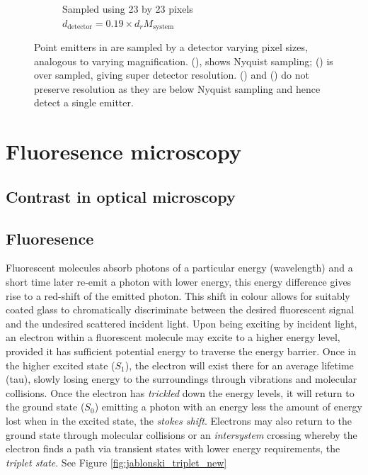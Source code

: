 \begin{figure}
\begin{subfigure}[b]{0.4\textwidth}
        \caption{Sampled using 23 by 23 pixels\\$d_{\text{detector}} = 0.19 \times d_{r}M_{\text{system}}$}
        \label{fig:digital_airy_sample_23}
    \end{subfigure}
    \caption{Point emitters in  are sampled by a detector varying pixel sizes, analogous to varying magnification.
    (), shows Nyquist sampling;
    () is over sampled, giving super detector resolution.
    () and () do not preserve resolution as they are below Nyquist sampling and hence detect a single emitter.}
    \label{fig:airy_disk_resolution}
\end{figure}


%
%


\section{Fluoresence microscopy}
\subsection{Contrast in optical microscopy}
\subsection{Fluoresence}

Fluorescent molecules absorb photons of a particular energy (wavelength) and a short time later re-emit a photon with lower energy, this energy difference gives rise to a red-shift of the emitted photon.
This shift in colour allows for suitably coated glass to chromatically discriminate between the desired fluorescent signal and the undesired scattered incident light.
Upon being exciting by incident light, an electron within a fluorescent molecule may excite to a higher energy level, provided it has sufficient potential energy to traverse the energy barrier.
Once in the higher excited state ($S_1$), the electron will exist there for an average lifetime (\gls{tau}), slowly losing energy to the surroundings through vibrations and molecular collisions.
Once the electron has \emph{trickled} down the energy levels, it will return to the ground state ($S_0$) emitting a photon with an energy less the amount of energy lost when in the excited state, the \emph{\Gls{stokes shift}}.
Electrons may also return to the ground state through molecular collisions or an \emph{intersystem} crossing whereby the electron finds a path via transient states with lower energy requirements, the \emph{triplet state}.
See Figure \ref{fig:jablonski_triplet_new}

